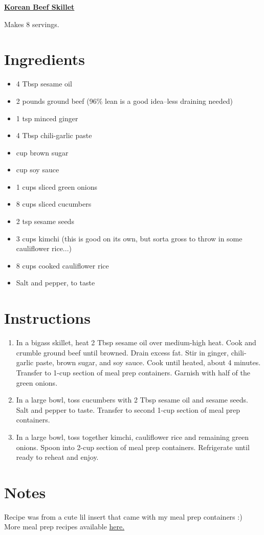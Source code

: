 \documentclass[11pt]{article}
\begin{document}
	\begin{center}\begin{huge}\underline{\textbf{Korean Beef Skillet}}\end{huge}\end{center}
	
	Makes 8 servings.

	\section*{Ingredients}
	\vspace{-1ex}
	\begin{itemize}
		\item 4 Tbsp sesame oil
		\item 2 pounds ground beef (96\% lean is a good idea--less draining needed)
		\item 1 tsp minced ginger
		\item 4 Tbsp chili-garlic paste
		\item {} cup brown sugar
		\item {} cup soy sauce
		\item 1  cups sliced green onions
		\item 8 cups sliced cucumbers
		\item 2 tsp sesame seeds
		\item 3 cups kimchi (this is good on its own, but sorta gross to throw in some cauliflower rice...)
		\item 8 cups cooked cauliflower rice
		\item Salt and pepper, to taste
	\end{itemize}
	
	\section*{Instructions}
	\begin{enumerate}
		\item In a bigass skillet, heat 2 Tbsp sesame oil over medium-high heat. Cook and crumble ground beef until browned. Drain excess fat. Stir in ginger, chili-garlic paste, brown sugar, and soy sauce. Cook until heated, about 4 minutes. Transfer to 1-cup section of meal prep containers. Garnish with half of the green onions.
		\item In a large bowl, toss cucumbers with 2 Tbsp sesame oil and sesame seeds. Salt and pepper to taste. Transfer to second 1-cup section of meal prep containers.
		\item In a large bowl, toss together kimchi, cauliflower rice and remaining green onions. Spoon into 2-cup section of meal prep containers. Refrigerate until ready to reheat and enjoy.
	\end{enumerate}
	
	\section*{Notes}
	Recipe was from a cute lil insert that came with my meal prep containers :)\\
	More meal prep recipes available \href{https://www.goodcook.com/recipes/category/meal-prep}{here.}
	
\end{document}
